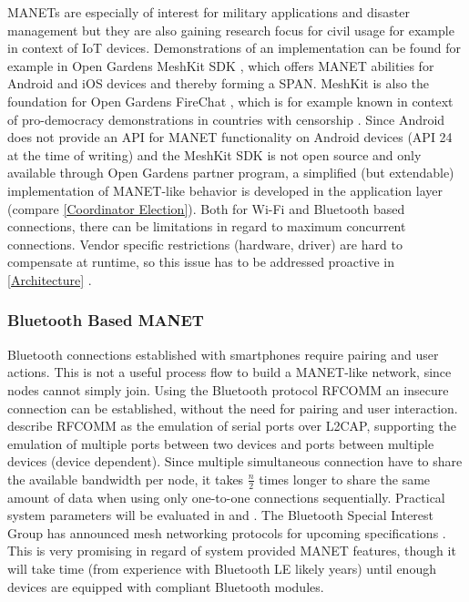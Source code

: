 \glspl{MANET} are especially of interest for military applications and disaster management but they are also gaining research focus for civil usage for example in context of \gls{IoT} devices. Demonstrations of an implementation can be found for example in Open Gardens MeshKit \gls{SDK} \autocite{Online:MeshKit}, which offers \gls{MANET} abilities for Android and iOS devices and thereby forming a \gls{SPAN}. MeshKit is also the foundation for Open Gardens FireChat \autocite{Online:FireChat}, which is for example known in context of pro-democracy demonstrations in countries with censorship \autocite{Online:Hern2014}. Since Android does not provide an \gls{API} for \gls{MANET} functionality on Android devices (\gls{API} 24 at the time of writing) and the MeshKit \gls{SDK} is not open source and only available through Open Gardens partner program, a simplified (but extendable) implementation of \gls{MANET}-like behavior is developed in the application layer (compare \ref{Coordinator Election}).
Both for Wi-Fi and Bluetooth based connections, there can be limitations in regard to maximum concurrent connections. Vendor specific restrictions (hardware, driver) are hard to compensate at runtime, so this issue has to be addressed proactive in \ref{Architecture} .

\subsubsection{Bluetooth Based \gls{MANET}}

Bluetooth connections established with smartphones require pairing and user actions. This is not a useful process flow to build a \gls{MANET}-like network, since nodes cannot simply join.
Using the Bluetooth protocol \gls{RFCOMM} an insecure connection can be established, without the need for pairing and user interaction. \textcite{RFCOMM2012} describe \gls{RFCOMM} as the emulation of serial ports over \gls{L2CAP}, supporting the emulation of multiple ports between two devices and ports between multiple devices (device dependent).
Since multiple simultaneous connection have to share the available bandwidth per node, it takes $\frac{n}{2}$ times longer to share the same amount of data when using only one-to-one connections sequentially. Practical system parameters will be evaluated in  and .
The Bluetooth Special Interest Group has announced mesh networking protocols for upcoming specifications \autocite{Online:BluetoothMesh}. This is very promising in regard of system provided \gls{MANET} features, though it will take time (from experience with Bluetooth LE likely years) until enough devices are equipped with compliant Bluetooth modules.

